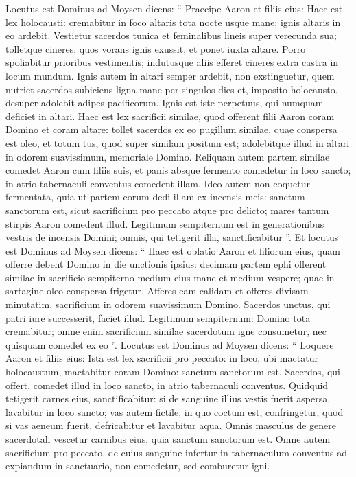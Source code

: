 \begin{biblechapter}
\begin{biblechapter}
\begin{biblechapter}
\begin{biblechapter}
\begin{biblechapter}
\begin{biblechapter}
\verse Locutus est Dominus ad Moysen dicens: 
\verse “ Praecipe Aaron et filiis eius: Haec est lex holocausti: cremabitur in foco altaris tota nocte usque mane; ignis altaris in eo ardebit. 
\verse Vestietur sacerdos tunica et feminalibus lineis super verecunda sua; tolletque cineres, quos vorans ignis exussit, et ponet iuxta altare. 
\verse Porro spoliabitur prioribus vestimentis; indutusque aliis efferet cineres extra castra in locum mundum. 
\verse Ignis autem in altari semper ardebit, non exstinguetur, quem nutriet sacerdos subiciens ligna mane per singulos dies et, imposito holocausto, desuper adolebit adipes pacificorum. 
 \verse Ignis est iste perpetuus, qui numquam deficiet in altari.
 \verse Haec est lex sacrificii similae, quod offerent filii Aaron coram Domino et coram altare: 
\verse tollet sacerdos ex eo pugillum similae, quae conspersa est oleo, et totum tus, quod super similam positum est; adolebitque illud in altari in odorem suavissimum, memoriale Domino. 
\verse Reliquam autem partem similae comedet Aaron cum filiis suis, et panis absque fermento comedetur in loco sancto; in atrio tabernaculi conventus comedent illam. 
\verse Ideo autem non coquetur fermentata, quia ut partem eorum dedi illam ex incensis meis: sanctum sanctorum est, sicut sacrificium pro peccato atque pro delicto; 
\verse mares tantum stirpis Aaron comedent illud. Legitimum sempiternum est in generationibus vestris de incensis Domini; omnis, qui tetigerit illa, sanctificabitur ”.
 \verse Et locutus est Dominus ad Moysen dicens: 
\verse “ Haec est oblatio Aaron et filiorum eius, quam offerre debent Domino in die unctionis ipsius: decimam partem ephi offerent similae in sacrificio sempiterno medium eius mane et medium vespere; 
\verse quae in sartagine oleo conspersa frigetur. Afferes eam calidam et offeres divisam minutatim, sacrificium in odorem suavissimum Domino. 
\verse Sacerdos unctus, qui patri iure successerit, faciet illud. Legitimum sempiternum: Domino tota cremabitur; 
\verse omne enim sacrificium similae sacerdotum igne consumetur, nec quisquam comedet ex eo ”.
 \verse Locutus est Dominus ad Moysen dicens: 
\verse “ Loquere Aaron et filiis eius: Ista est lex sacrificii pro peccato: in loco, ubi mactatur holocaustum, mactabitur coram Domino: sanctum sanctorum est. 
\verse Sacerdos, qui offert, comedet illud in loco sancto, in atrio tabernaculi conventus. 
\verse Quidquid tetigerit carnes eius, sanctificabitur: si de sanguine illius vestis fuerit aspersa, lavabitur in loco sancto; 
\verse vas autem fictile, in quo coctum est, confringetur; quod si vas aeneum fuerit, defricabitur et lavabitur aqua. 
\verse Omnis masculus de genere sacerdotali vescetur carnibus eius, quia sanctum sanctorum est. 
\verse Omne autem sacrificium pro peccato, de cuius sanguine infertur in tabernaculum conventus ad expiandum in sanctuario, non comedetur, sed comburetur igni.
 

\end{biblechapter}
\end{biblechapter}
\end{biblechapter}
\end{biblechapter}
\end{biblechapter}
\end{biblechapter}

